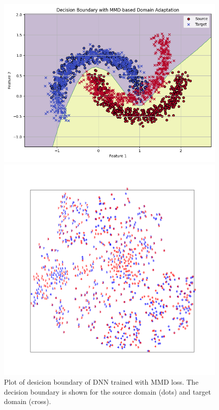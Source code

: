 \documentclass{article}
\begin{document}
\begin{figure}
  \centering
  \begin{minipage}{0.3\textwidth}
    \centering
    \includegraphics[width=\textwidth]{MMD/adaptation.png}
    \caption{Plot of desicion boundary of DNN trained with MMD loss. The decision boundary is shown for the source domain (dots) and target domain (cross).}
    \label{fig:mmd}
  \end{minipage}
  \hfill
  \begin{minipage}{0.3\textwidth}
    \centering
    \includegraphics[width=\textwidth]{DANN/DANN.png}

\end{minipage}
\end{figure}
\end{document}
